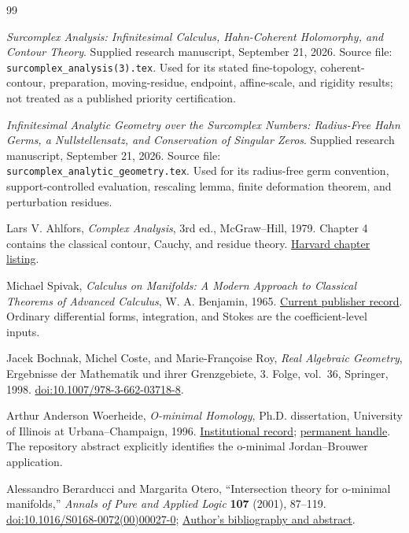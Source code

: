\documentclass[11pt,letterpaper]{article}
\theoremstyle{definition}
\theoremstyle{remark}
\numberwithin{equation}{section}
\begin{document}
\begin{thebibliography}{99}
\emph{Surcomplex Analysis: Infinitesimal Calculus, Hahn-Coherent Holomorphy, and Contour Theory}.
Supplied research manuscript, September 21, 2026.
Source file: \texttt{surcomplex\_analysis(3).tex}.
Used for its stated fine-topology, coherent-contour, preparation, moving-residue, endpoint, affine-scale, and rigidity results; not treated as a published priority certification.

\emph{Infinitesimal Analytic Geometry over the Surcomplex Numbers: Radius-Free Hahn Germs, a Nullstellensatz, and Conservation of Singular Zeros}.
Supplied research manuscript, September 21, 2026.
Source file: \texttt{surcomplex\_analytic\_geometry.tex}.
Used for its radius-free germ convention, support-controlled evaluation, rescaling lemma, finite deformation theorem, and perturbation residues.

Lars V. Ahlfors, \emph{Complex Analysis}, 3rd ed., McGraw--Hill, 1979.
Chapter 4 contains the classical contour, Cauchy, and residue theory.
\href{https://abel.math.harvard.edu/graduate/books/ahlfors.html}{Harvard chapter listing}.

Michael Spivak, \emph{Calculus on Manifolds: A Modern Approach to Classical Theorems of Advanced Calculus}, W. A. Benjamin, 1965.
\href{https://www.routledge.com/Calculus-On-Manifolds-A-Modern-Approach-To-Classical-Theorems-Of-Advan/Spivak/p/book/9780805390216}{Current publisher record}.
Ordinary differential forms, integration, and Stokes are the coefficient-level inputs.

Jacek Bochnak, Michel Coste, and Marie-Fran\c{c}oise Roy,
\emph{Real Algebraic Geometry}, Ergebnisse der Mathematik und ihrer Grenzgebiete, 3. Folge, vol.~36, Springer, 1998.
\href{https://doi.org/10.1007/978-3-662-03718-8}{doi:10.1007/978-3-662-03718-8}.

Arthur Anderson Woerheide, \emph{O-minimal Homology}, Ph.D. dissertation, University of Illinois at Urbana--Champaign, 1996.
\href{https://www.ideals.illinois.edu/items/19783}{Institutional record};
\href{https://hdl.handle.net/2142/19648}{permanent handle}.
The repository abstract explicitly identifies the o-minimal Jordan--Brouwer application.

Alessandro Berarducci and Margarita Otero,
``Intersection theory for o-minimal manifolds,''
\emph{Annals of Pure and Applied Logic} \textbf{107} (2001), 87--119.
\href{https://doi.org/10.1016/S0168-0072(00)00027-0}{doi:10.1016/S0168-0072(00)00027-0};
\href{https://web.dm.unipi.it/berardu/pubblicazioni_abstracts.html}{Author's bibliography and abstract}.


\end{thebibliography}
\end{document}
